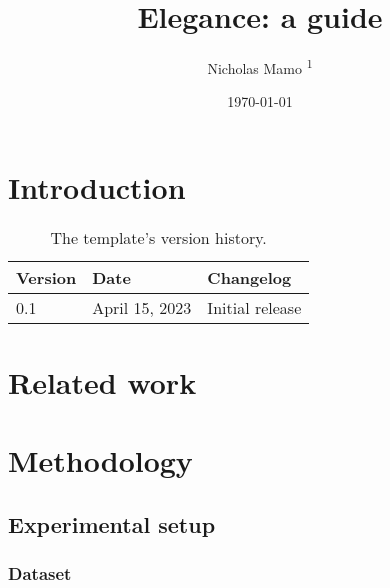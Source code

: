 \documentclass[twocolumn]{elegantarticle}
\title{Elegance: a guide}
\author{Nicholas Mamo \textsuperscript{1}}
\affiliation{\textsuperscript{1} Independent}
\date{\today}
\begin{document}
	\maketitle
	
	\section{Introduction}
	
		\lipsum[1-3]
		
		\begin{table*}[t!]
			\begin{tabularx}{\linewidth}{ l l X }
				\textbf{Version} & \textbf{Date} & \textbf{Changelog} \\ \hline
				0.1 & April 15, 2023 & Initial release \\
			\end{tabularx}
			\caption{The template's version history.}
			\label{table: version history}
		\end{table*}
	
	\section{Related work}
	
		\lipsum[4-8]
		
	\section{Methodology}
	
		\lipsum[9]
		
		\subsection{Experimental setup}
		
			\lipsum[10]
			
			\subsubsection{Dataset}
			
				\lipsum[11]
\end{document}
